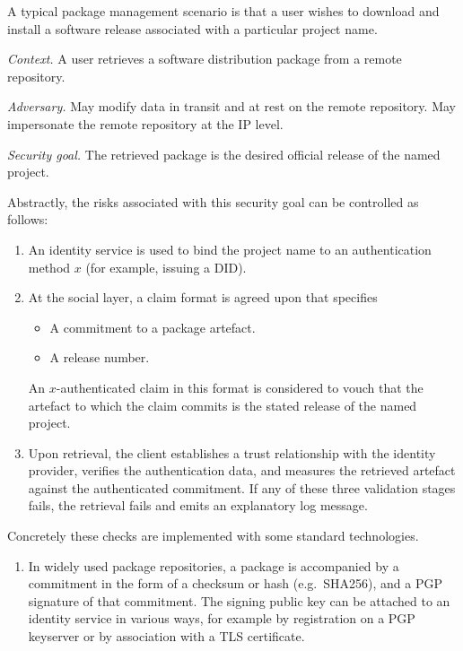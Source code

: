 \begin{example} \label{package-management}

  A typical package management scenario is that a user wishes to download and install a software release associated with a particular project name.

\emph{Context.} A user retrieves a software distribution package from a remote repository.

\emph{Adversary.} May modify data in transit and at rest on the remote repository. May impersonate the remote repository at the IP level.

\emph{Security goal.} The retrieved package is the desired official release of the named project.

Abstractly, the risks associated with this security goal can be controlled as follows:
\begin{enumerate}
  \item 
    An identity service is used to bind the project name to an authentication method $x$ (for example, issuing a DID).
  \item 
    At the social layer, a claim format is agreed upon that specifies
    \begin{itemize}
      \item A commitment to a package artefact.
      \item A release number.
    \end{itemize}
    An $x$-authenticated claim in this format is considered to vouch that the artefact to which the claim commits is the stated release of the named project.
  \item 
    Upon retrieval, the client establishes a trust relationship with the identity provider, verifies the authentication data, and measures the retrieved artefact against the authenticated commitment.
    If any of these three validation stages fails, the retrieval fails and emits an explanatory log message.

  \end{enumerate}
  Concretely these checks are implemented with some standard technologies.
  \begin{enumerate}
  \item
    In widely used package repositories, a package is accompanied by a commitment in the form of a checksum or hash (e.g.~SHA256), and a PGP signature of that commitment.
    The signing public key can be attached to an identity service in various ways, for example by registration on a PGP keyserver or by association with a TLS certificate.


\end{enumerate}
\end{example}
